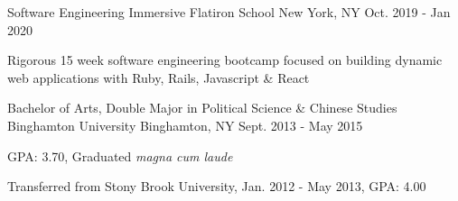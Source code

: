 
\begin{cventries}

  \cventry
    {Software Engineering Immersive} %
    {Flatiron School\vspace{-2.0mm}} %
    {New York, NY\vspace{-2.0mm}} %
    {Oct. 2019 - Jan 2020} %
    {
      \begin{cvitems} %
        \item {Rigorous 15 week software engineering bootcamp focused on building dynamic web applications with Ruby, Rails, Javascript \& React}
      \end{cvitems}
  }


  \cventry
    {Bachelor of Arts, Double Major in Political Science \& Chinese Studies} %
    {Binghamton University\vspace{-2.0mm}} %
    {Binghamton, NY\vspace{-2.0mm}} %
    {Sept. 2013 - May 2015} %
    {
      \begin{cvitems} %
        \item {GPA: 3.70, Graduated \textit{magna cum laude}}
        \item Transferred from Stony Brook University, Jan. 2012 - May 2013, GPA: 4.00
      \end{cvitems}
    }



\end{cventries}

